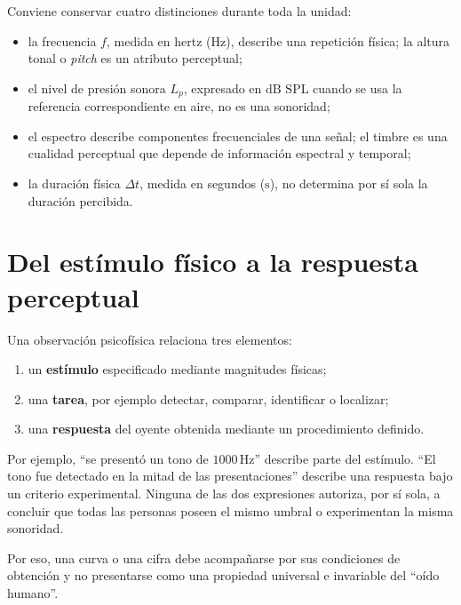 Conviene conservar cuatro distinciones durante toda la unidad:

\begin{itemize}
    \item la frecuencia \(f\), medida en hertz (\(\text{Hz}\)), describe una
    repetición física; la altura tonal o \emph{pitch} es un atributo
    perceptual;
    \item el nivel de presión sonora \(L_p\), expresado en
    \(\text{dB SPL}\) cuando se usa la referencia correspondiente en aire, no
    es una sonoridad;
    \item el espectro describe componentes frecuenciales de una señal; el
    timbre es una cualidad perceptual que depende de información espectral y
    temporal;
    \item la duración física \(\Delta t\), medida en segundos
    (\(\text{s}\)), no determina por sí sola la duración percibida.
\end{itemize}

\section{Del estímulo físico a la respuesta perceptual}
\label{sec:u7-fisico-perceptual}

Una observación psicofísica relaciona tres elementos:

\begin{enumerate}
    \item un \textbf{estímulo} especificado mediante magnitudes físicas;
    \item una \textbf{tarea}, por ejemplo detectar, comparar, identificar o
    localizar;
    \item una \textbf{respuesta} del oyente obtenida mediante un procedimiento
    definido.
\end{enumerate}

Por ejemplo, ``se presentó un tono de \(1000\,\text{Hz}\)'' describe parte del
estímulo. ``El tono fue detectado en la mitad de las presentaciones'' describe
una respuesta bajo un criterio experimental. Ninguna de las dos expresiones
autoriza, por sí sola, a concluir que todas las personas poseen el mismo
umbral o experimentan la misma sonoridad.

 Por eso, una curva o una cifra
debe acompañarse por sus condiciones de obtención y no presentarse como una
propiedad universal e invariable del ``oído humano''.

